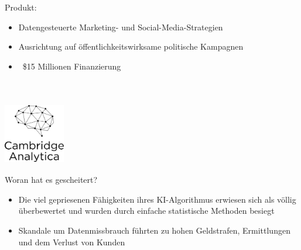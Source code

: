 \documentclass[handout]{beamer}
\begin{document}
\begin{frame}
    \vspace{-0.5cm}
    Produkt: \\
    \begin{itemize}
        \item<1-> Datengesteuerte Marketing- und Social-Media-Strategien
        \item<2-> Ausrichtung auf öffentlichkeitswirksame politische Kampagnen
        \item<3-> ~\$15 Millionen Finanzierung
    \end{itemize} ~\\
\end{frame}

\begin{frame}
    \frametitle{\includegraphics[width=0.2\textwidth]{cambridge-analytica.png}}
    Woran hat es gescheitert? \\
    \begin{itemize}
        \item<1-> Die viel gepriesenen Fähigkeiten ihres KI-Algorithmus erwiesen sich als völlig überbewertet und wurden durch einfache statistische Methoden besiegt
        \item<2-> Skandale um Datenmissbrauch führten zu hohen Geldstrafen, Ermittlungen und dem Verlust von Kunden
    \end{itemize} ~\\
\end{frame}
\end{document}
